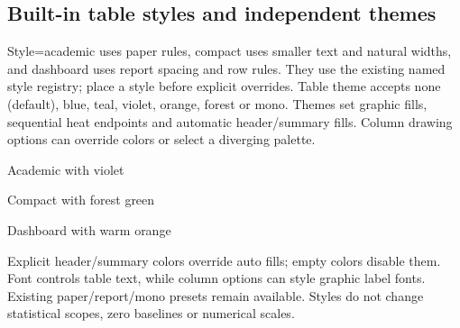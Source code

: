 \subsection{Built-in table styles and independent themes}
Style=academic uses paper rules, compact uses smaller text and natural widths,
and dashboard uses report spacing and row rules. They use the existing named
style registry; place a style before explicit overrides.
Table theme accepts none (default), blue, teal, violet, orange, forest or mono.
Themes set graphic fills, sequential heat endpoints and automatic header/summary
fills. Column drawing options can override colors or select a diverging palette.
\begin{demo}{Academic with violet}
\begin{center}
\begin{gradtable}[align=c,header align=c,style=academic,theme=violet,width=\linewidth]
\end{gradtable}
\end{center}
\end{demo}
\begin{demo}{Compact with forest green}
\begin{center}
\begin{gradtable}[align=c,header align=c,style=compact,theme=forest,width=\linewidth]
\end{gradtable}
\end{center}
\end{demo}
\begin{demo}{Dashboard with warm orange}
\begin{center}
\begin{gradtable}[align=c,header align=c,style=dashboard,theme=orange,width=\linewidth]
\end{gradtable}
\end{center}
\end{demo}
Explicit header/summary colors override auto fills; empty colors disable them.
Font controls table text, while column options can style graphic label fonts.
Existing paper/report/mono presets remain available. Styles do not change
statistical scopes, zero baselines or numerical scales.


